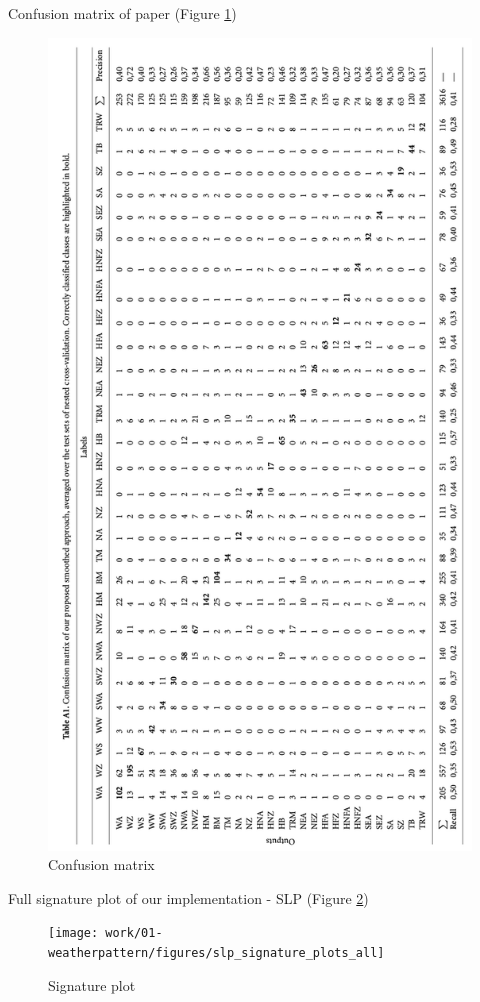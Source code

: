 \documentclass[
]{krantz}
\begin{document}
Confusion matrix of paper (Figure \ref{fig:confpaper}) \citep{Mittermeier2022}

\begin{figure}

{\centering \includegraphics[width=0.7\linewidth]{work/01-weatherpattern/figures/paper/confusion} 

}

\caption{Confusion matrix}\label{fig:confpaper}
\end{figure}

Full signature plot of our implementation - SLP (Figure \ref{fig:sigfull})

\begin{figure}

{\centering \texttt{[image: work/01-weatherpattern/figures/slp\_signature\_plots\_all]} 

}

\caption{Signature plot}\label{fig:sigfull}
\end{figure}
\end{document}
